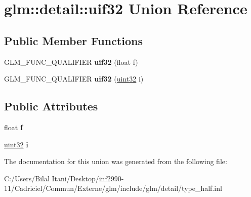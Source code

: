 \hypertarget{unionglm_1_1detail_1_1uif32}{}\section{glm\+:\+:detail\+:\+:uif32 Union Reference}
\label{unionglm_1_1detail_1_1uif32}
\subsection*{Public Member Functions}
\begin{DoxyCompactItemize}
\item 
G\+L\+M\+\_\+\+F\+U\+N\+C\+\_\+\+Q\+U\+A\+L\+I\+F\+I\+ER {\bfseries uif32} (float f)\hypertarget{unionglm_1_1detail_1_1uif32_ae86c2bd42a88f11e3217d14e46606971}{}\label{unionglm_1_1detail_1_1uif32_ae86c2bd42a88f11e3217d14e46606971}

\item 
G\+L\+M\+\_\+\+F\+U\+N\+C\+\_\+\+Q\+U\+A\+L\+I\+F\+I\+ER {\bfseries uif32} (\hyperlink{group__gtc__type__precision_ga202b6a53c105fcb7e531f9b443518451}{uint32} i)\hypertarget{unionglm_1_1detail_1_1uif32_a3d5981678c930776894daf8e94295fe2}{}\label{unionglm_1_1detail_1_1uif32_a3d5981678c930776894daf8e94295fe2}

\end{DoxyCompactItemize}
\subsection*{Public Attributes}
\begin{DoxyCompactItemize}
\item 
float {\bfseries f}\hypertarget{unionglm_1_1detail_1_1uif32_a5f697f84c5a8ec72c2f3a4f705f5bde8}{}\label{unionglm_1_1detail_1_1uif32_a5f697f84c5a8ec72c2f3a4f705f5bde8}

\item 
\hyperlink{group__gtc__type__precision_ga202b6a53c105fcb7e531f9b443518451}{uint32} {\bfseries i}\hypertarget{unionglm_1_1detail_1_1uif32_a981c1c59e160db23c73908cd7e629229}{}\label{unionglm_1_1detail_1_1uif32_a981c1c59e160db23c73908cd7e629229}

\end{DoxyCompactItemize}


The documentation for this union was generated from the following file\+:\begin{DoxyCompactItemize}
\item 
C\+:/\+Users/\+Bilal Itani/\+Desktop/inf2990-\/11/\+Cadriciel/\+Commun/\+Externe/glm/include/glm/detail/type\+\_\+half.\+inl\end{DoxyCompactItemize}
